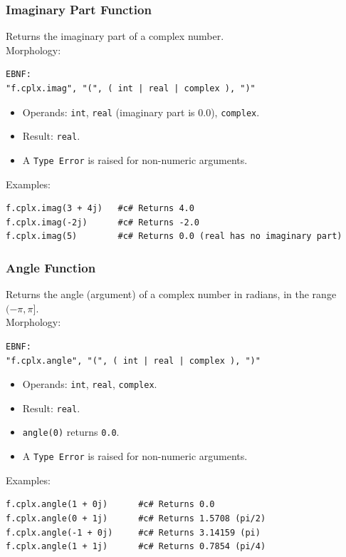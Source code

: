 \subsubsection{Imaginary Part Function}
Returns the imaginary part of a complex number. \\
Morphology:
\begin{verbatim}
EBNF:
"f.cplx.imag", "(", ( int | real | complex ), ")"
\end{verbatim}
\begin{itemize}
\item Operands: \texttt{int}, \texttt{real} (imaginary part is 0.0), \texttt{complex}.
\item Result: \texttt{real}.
\item A \texttt{Type Error} is raised for non-numeric arguments.
\end{itemize}
Examples:
\begin{verbatim}
f.cplx.imag(3 + 4j)   #c# Returns 4.0
f.cplx.imag(-2j)      #c# Returns -2.0
f.cplx.imag(5)        #c# Returns 0.0 (real has no imaginary part)
\end{verbatim}

\subsubsection{Angle Function}
Returns the angle (argument) of a complex number in radians, in the range $(-\pi, \pi]$. \\
Morphology:
\begin{verbatim}
EBNF:
"f.cplx.angle", "(", ( int | real | complex ), ")"
\end{verbatim}
\begin{itemize}
\item Operands: \texttt{int}, \texttt{real}, \texttt{complex}.
\item Result: \texttt{real}.
\item \texttt{angle(0)} returns \texttt{0.0}.
\item A \texttt{Type Error} is raised for non-numeric arguments.
\end{itemize}
Examples:
\begin{verbatim}
f.cplx.angle(1 + 0j)      #c# Returns 0.0
f.cplx.angle(0 + 1j)      #c# Returns 1.5708 (pi/2)
f.cplx.angle(-1 + 0j)     #c# Returns 3.14159 (pi)
f.cplx.angle(1 + 1j)      #c# Returns 0.7854 (pi/4)
\end{verbatim}

